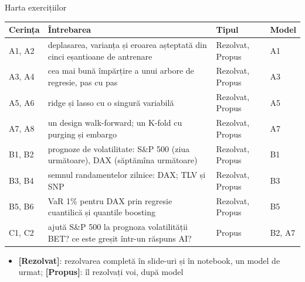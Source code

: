 \begin{frame}{Harta exercițiilor}
\itemsize{\small}
\begin{center}
\footnotesize
\begin{tabular}{>{\raggedright\arraybackslash}p{1.1cm}>{\raggedright\arraybackslash}p{7.5cm}>{\raggedright\arraybackslash}p{1.9cm}>{\raggedright\arraybackslash}p{1.4cm}}
\toprule
\textbf{Cerința} & \textbf{Întrebarea} & \textbf{Tipul} & \textbf{Model} \\
\midrule
A1, A2 & deplasarea, varianța și eroarea așteptată din cinci eșantioane de antrenare & Rezolvat, Propus & A1 \\
A3, A4 & cea mai bună împărțire a unui arbore de regresie, pas cu pas & Rezolvat, Propus & A3 \\
A5, A6 & ridge și lasso cu o singură variabilă & Rezolvat, Propus & A5 \\
A7, A8 & un design walk-forward; un K-fold cu purging și embargo & Rezolvat, Propus & A7 \\
B1, B2 & prognoze de volatilitate: S\&P 500 (ziua următoare), DAX (săptămîna următoare) & Rezolvat, Propus & B1 \\
B3, B4 & semnul randamentelor zilnice: DAX; TLV și SNP & Rezolvat, Propus & B3 \\
B5, B6 & VaR 1\% pentru DAX prin regresie cuantilică și quantile boosting & Rezolvat, Propus & B5 \\
C1, C2 & ajută S\&P 500 la prognoza volatilității BET? ce este greșit într-un răspuns AI? & Propus & B2, A7 \\
\bottomrule
\end{tabular}
\end{center}
\begin{itemize}
    \item \textbf{[Rezolvat]}: rezolvarea completă în slide-uri și în notebook, un model de urmat; \textbf{[Propus]}: îl rezolvați voi, după model
\end{itemize}
\end{frame}

